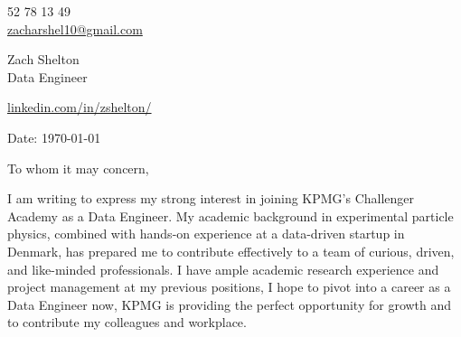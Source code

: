 \documentclass[11pt,a4]{article}
\begin{document}
\begin{center}
    \begin{minipage}[b]{0.24\textwidth}
            \large 52 78 13 49 \\
            \large \href{mailto:zshelton1997@gmail.com}{zacharshel10@gmail.com} 
    \end{minipage}%
    \begin{minipage}[b]{0.5\textwidth}
            \centering
            {\Huge Zach Shelton} \\ %
            \vspace{0.1cm}
            {\color{UI_blue} \Large{Data Engineer}} \\
    \end{minipage}%
    \begin{minipage}[b]{0.24\textwidth}
            \flushright \large
            {\href{https://www.linkedin.com/in/zshelton/}{linkedin.com/in/zshelton/} } \\

    \end{minipage}   
    
\vspace{-0.15cm} 
{\color{UI_blue} \hrulefill}
\end{center}

\justify
\setlength{\parindent}{0pt}
\setlength{\parskip}{12pt}
\vspace{0.1cm}


Date: \today \par \vspace{-0.1cm}

To whom it may concern,

I am writing to express my strong interest in joining KPMG's Challenger Academy as a Data Engineer. My academic background in experimental particle physics, combined with hands-on experience at a data-driven startup in Denmark, has prepared me to contribute effectively to a team of curious, driven, and like-minded professionals. I have ample academic research experience and project management at my previous positions, I hope to pivot into a career as a Data Engineer now, KPMG is providing the perfect opportunity for growth and to contribute my colleagues and workplace.
\end{document}
